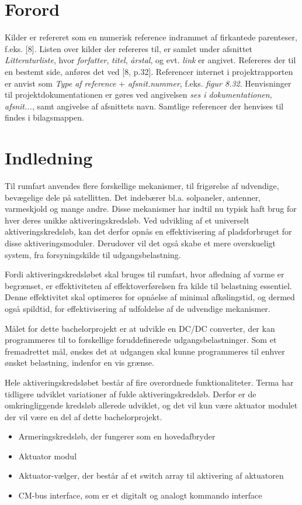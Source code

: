 
\chapter*{Forord} 

Kilder er refereret som en numerisk reference indrammet af firkantede parenteser, f.eks. [8]. Listen over kilder der refereres til, er samlet under afsnittet \textit{Litteraturliste}, hvor \textit{forfatter}, \textit{titel}, \textit{årstal}, og evt. \textit{link} er angivet. Refereres der til en bestemt side, anføres det ved [8, p.32]. Referencer internet i projektrapporten er anvist som \textit{Type af reference} + \textit{afsnit.nummer}, f.eks. \textit{figur 8.32}. Henvisninger til projektdokumentationen er gøres ved  angivelsen \textit{ses i dokumentationen, afsnit...}, samt angivelse af afsnittets navn. Samtlige referencer der henvises til findes i bilagsmappen. 


{\let\clearpage\relax \chapter{Indledning}}
\noindent Til rumfart anvendes flere forskellige mekanismer, til frigørelse af udvendige, bevægelige dele på satellitten. Det indebærer bl.a. solpaneler, antenner, varmeskjold og mange andre. Disse mekanismer har indtil nu typisk haft brug for hver deres unikke aktiveringskredsløb. Ved udvikling af et universelt aktiveringskredsløb, kan det derfor opnås en effektivisering af pladsforbruget for disse aktiveringsmoduler. Derudover vil det også skabe et mere overskueligt system, fra forsyningskilde til udgangsbelastning. 

Fordi aktiveringskredsløbet skal bruges til rumfart, hvor afledning af varme er begrænset, er effektiviteten af effektoverførelsen fra kilde til belastning essentiel. Denne effektivitet skal optimeres for opnåelse af minimal afkølingstid, og dermed også spildtid, for effektivisering af udfoldelse af de udvendige mekanismer\cite{projekt-oplag}. 

Målet for dette bachelorprojekt er at udvikle en DC/DC converter, der kan programmeres til to forskellige foruddefinerede udgangsbelastninger. Som et fremadrettet mål, ønskes det at udgangen skal kunne programmeres til enhver ønsket belastning, indenfor en vis grænse. 

Hele aktiveringskredsløbet består af fire overordnede funktionaliteter. Terma har tidligere udviklet variationer af fulde aktiveringskredsløb. Derfor er de omkringliggende kredsløb allerede udviklet, og det vil kun være aktuator modulet der vil være en del af dette bachelorprojekt.
\begin{itemize}
	\item Armeringskredsløb, der fungerer som en hovedafbryder
	\item Aktuator modul
	\item Aktuator-vælger, der består af et switch array til aktivering af aktuatoren
	\item CM-bus interface, som er et digitalt og analogt kommando interface
\end{itemize}

